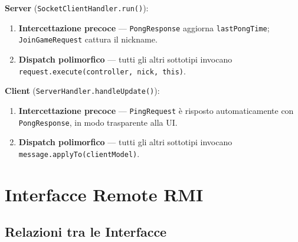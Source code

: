 \documentclass[a4paper,12pt]{article}
\newcommand{\code}[1]{\texttt{#1}}
\begin{document}
\textbf{Server} (\code{SocketClientHandler.run()}):
\begin{enumerate}[leftmargin=*, label=\textbf{\arabic*.}]
  \item \textbf{Intercettazione precoce} --- \code{PongResponse} aggiorna
    \code{lastPongTime}; \code{JoinGameRequest} cattura il nickname.
  \item \textbf{Dispatch polimorfico} --- tutti gli altri sottotipi invocano
    \code{request.execute(controller, nick, this)}.
\end{enumerate}

\textbf{Client} (\code{ServerHandler.handleUpdate()}):
\begin{enumerate}[leftmargin=*, label=\textbf{\arabic*.}]
  \item \textbf{Intercettazione precoce} --- \code{PingRequest} è risposto
    automaticamente con \code{PongResponse}, in modo trasparente alla UI.
  \item \textbf{Dispatch polimorfico} --- tutti gli altri sottotipi invocano
    \code{message.applyTo(clientModel)}.
\end{enumerate}

\newpage
\section{Interfacce Remote RMI}

\subsection{Relazioni tra le Interfacce}
\end{document}
